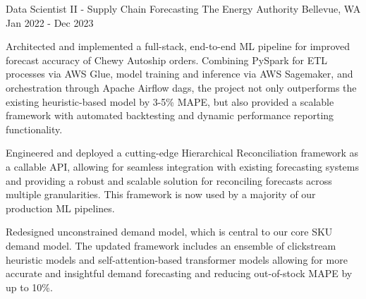 

\begin{cventries}

\cventrytwopositions
    {Data Scientist II - Supply Chain Forecasting}
    {The Energy Authority}
    {Bellevue, WA}
    {Jan 2022 - Dec 2023}
    {
          \begin{cvitems}    
        \item {Architected and implemented a full-stack, end-to-end ML pipeline for improved forecast accuracy of Chewy Autoship orders. Combining PySpark for ETL processes via AWS Glue, model training and inference via AWS Sagemaker, and orchestration through Apache Airflow dags, the project not only outperforms the existing heuristic-based model by 3-5\% MAPE, but also provided a scalable framework with automated backtesting and dynamic performance reporting functionality.}    
        \item {Engineered and deployed a cutting-edge Hierarchical Reconciliation framework as a callable API, allowing for seamless integration with existing forecasting systems and providing a robust and scalable solution for reconciling forecasts across multiple granularities. This framework is now used by a majority of our production ML pipelines.}
        \item {Redesigned unconstrained demand model, which is central to our core SKU demand model. The updated framework includes an ensemble of clickstream heuristic models and self-attention-based transformer models allowing for more accurate and insightful demand forecasting and reducing out-of-stock MAPE by up to 10\%.}

\end{cvitems}}
\end{cventries}
